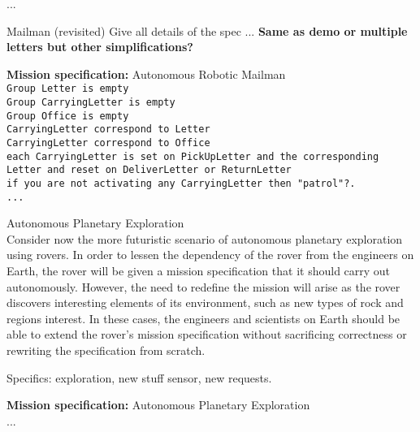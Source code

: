 ...

\begin{myExample}\label{Ex:mission1} Mailman (revisited)
	Give all details of the spec ... \textbf{Same as demo or multiple letters but other simplifications?}
\end{myExample}

\begin{algorithm}
	\textbf{Mission specification:} Autonomous Robotic Mailman\\
	{\small
	\texttt{Group Letter is empty}\\
	\texttt{Group CarryingLetter is empty}\\
	\texttt{Group Office is empty}\\
	\texttt{CarryingLetter correspond to Letter}\\
	\texttt{CarryingLetter correspond to Office}\\
	\texttt{each CarryingLetter is set on PickUpLetter and the corresponding Letter and reset on 			DeliverLetter or ReturnLetter}\\
	
	\texttt{if you are not activating any CarryingLetter then "patrol"?.}\\
	\texttt{...}
	}
\end{algorithm}

\begin{myExample}\label{Ex:mission2} Autonomous Planetary Exploration\\
	Consider now the more futuristic scenario of autonomous planetary exploration using rovers. In order to lessen the dependency of the rover from the engineers on Earth, the rover will be given a mission specification that it should carry out autonomously. However, the need to redefine the mission will arise as the rover discovers interesting elements of its environment, such as new types of rock and regions interest. In these cases, the engineers and scientists on Earth should be able to extend the rover's mission specification without sacrificing correctness or rewriting the specification from scratch.
	
	Specifics: exploration, new stuff sensor, new requests.
\end{myExample}

\begin{algorithm}
	\textbf{Mission specification:} Autonomous Planetary Exploration\\
	...
\end{algorithm}